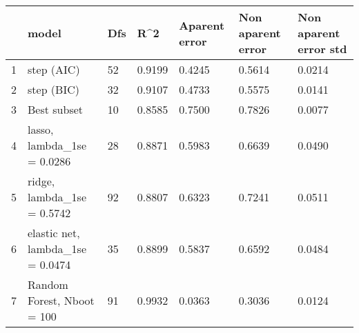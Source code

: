 \begin{tabular}{c|p{2cm}|p{2cm}|p{2cm}|p{2cm}|p{2cm}|p{2cm}}
\toprule
{} &                             model &  Dfs &    R\textasciicircum 2 &  Aparent error &  Non aparent error &  Non aparent error std \\
\midrule
1 &                        step (AIC) &   52 & 0.9199 &         0.4245 &             0.5614 &                 0.0214 \\
2 &                        step (BIC) &   32 & 0.9107 &         0.4733 &             0.5575 &                 0.0141 \\
3 &                       Best subset &   10 & 0.8585 &         0.7500 &             0.7826 &                 0.0077 \\
4 &        lasso, lambda\_1se = 0.0286 &   28 & 0.8871 &         0.5983 &             0.6639 &                 0.0490 \\
5 &        ridge, lambda\_1se = 0.5742 &   92 & 0.8807 &         0.6323 &             0.7241 &                 0.0511 \\
6 &  elastic net, lambda\_1se = 0.0474 &   35 & 0.8899 &         0.5837 &             0.6592 &                 0.0484 \\
7 &        Random Forest, Nboot = 100 &   91 & 0.9932 &         0.0363 &             0.3036 &                 0.0124 \\
\bottomrule
\end{tabular}
